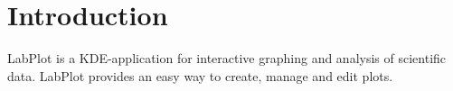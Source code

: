 \part{Introduction}
LabPlot is a KDE-application for interactive graphing and analysis of scientific data. LabPlot provides an easy way to create, manage and edit plots.
